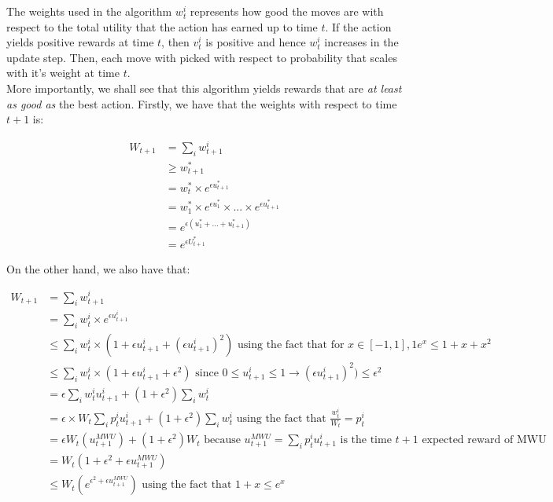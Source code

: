 \documentclass[12pt]{article}
\begin{document}
The weights used in the algorithm $w^i_t$ represents how good the moves are with respect to the total utility that the action has earned up to time $t$. If the action yields positive rewards at time $t$, then $v^i_t$ is positive and hence $w^i_t$ increases in the update step. Then, each move with picked with respect to probability that scales with it's weight at time $t$.\\

More importantly, we shall see that this algorithm yields rewards that are \textit{at least as good as} the best action. Firstly, we have that the weights with respect to time $t + 1$ is:

\begin{equation*}
\begin{aligned}
W_{t+1} &= \sum_i w^i_{t+1} \\
& \geq w^*_{t+1} \\
&= w^*_t \times  e^{\epsilon u^*_{t+1}} \\
&= w^*_1 \times e^{\epsilon u^*_{1}} \times ... \times e^{\epsilon u^*_{t+1}} \\
&= e^{\epsilon (u^*_{1} + ... + u^*_{t+1})} \\
&= e^{\epsilon U^*_{t+1}}
\end{aligned}
\end{equation*}

On the other hand, we also have that:

\begin{equation*}
\begin{aligned}
W_{t+1} &= \sum_i w^i_{t+1} \\
&= \sum_i w^i_t \times e^{\epsilon u^i_{t + 1}} \\
&\leq \sum_i w^i_t \times (1 + \epsilon u^i_{t+1} + (\epsilon u^i_{t+1})^2) \text{ using the fact that for $x \in [-1, 1], 1 e^x \leq 1 + x + x^2$}\\
&\leq \sum_i w^i_t \times (1 + \epsilon u^i_{t+1} + \epsilon^2) \text{ since $0 \leq u^i_{t+1} \leq 1 \rightarrow (\epsilon u^i_{t+1})^2) \leq \epsilon^2$}\\
&= \epsilon \sum_i w^i_t u^i_{t+1} + (1 + \epsilon^2) \sum_i w^i_t \\
&= \epsilon \times W_t \sum_i p^i_t u^i_{t+1} + (1 + \epsilon^2) \sum_i w^i_t \text{ using the fact that $\frac{w^i_t}{W_t} = p^i_t$}\\
&= \epsilon W_t (u^{MWU}_{t+1}) + (1 + \epsilon^2) W_t \text{ because $u^{MWU}_{t+1} = \sum_i p^i_t u^i_{t+1}$ is the time $t+1$ expected reward of MWU}\\
&= W_t (1 + \epsilon^2 + \epsilon u^{MWU}_{t+1})\\
&\leq W_t (e^{\epsilon^2 + \epsilon u^{MWU}_{t+1}}) \text{ using the fact that $1 + x \leq e^x$}
\end{aligned}
\end{equation*}
\end{document}
